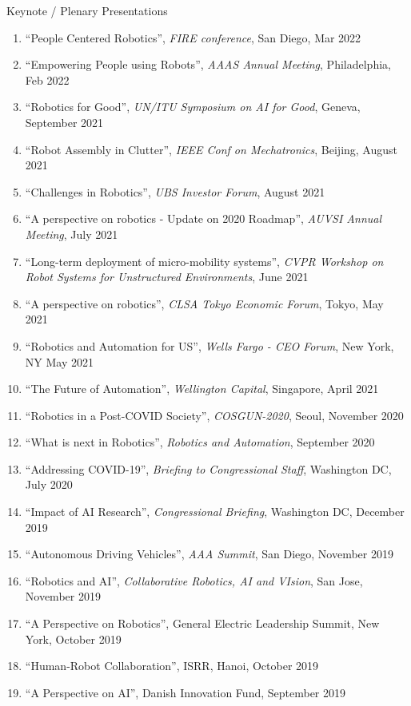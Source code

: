 \documentclass{article}
\begin{document}
\begin{cv}
\begin{cvlist}{Keynote / Plenary Presentations}
\item
  \begin{enumerate}
  \item ``People Centered Robotics'', {\em FIRE conference}, San Diego, Mar 2022
  \item ``Empowering People using Robots'', {\em AAAS Annual Meeting}, Philadelphia, Feb 2022
  \item ``Robotics for Good'', {\em UN/ITU Symposium on AI for Good}, Geneva, September 2021
  \item ``Robot Assembly in Clutter'', {\em IEEE Conf on Mechatronics}, Beijing, August 2021
  \item ``Challenges in Robotics'', {\em UBS Investor Forum}, August 2021
  \item ``A perspective on robotics - Update on 2020 Roadmap'', {\em  AUVSI Annual Meeting}, July 2021
  \item ``Long-term deployment of micro-mobility systems'', {\em CVPR Workshop on Robot Systems for Unstructured Environments}, June
    2021
  \item ``A perspective on robotics'', {\em CLSA Tokyo Economic Forum}, Tokyo, May 2021
  \item ``Robotics and Automation for US'', {\em Wells Fargo - CEO Forum}, New York, NY May 2021
  \item ``The Future of Automation'', {\em Wellington Capital}, Singapore, April 2021
  \item ``Robotics in a Post-COVID Society'', {\em COSGUN-2020}, Seoul, November 2020
  \item ``What is next in Robotics'', {\em Robotics and Automation}, September 2020
  \item ``Addressing COVID-19'', {\em Briefing to Congressional Staff}, Washington DC, July 2020
  \item ``Impact of AI Research'', {\em Congressional Briefing}, Washington DC, December 2019
  \item ``Autonomous Driving Vehicles'', {\em AAA Summit}, San Diego, November 2019
  \item ``Robotics and AI'', {\em Collaborative Robotics, AI and VIsion}, San Jose, November 2019
  \item ``A Perspective on Robotics'', General Electric Leadership Summit, New York, October 2019
  \item ``Human-Robot Collaboration'', ISRR, Hanoi, October 2019
  \item ``A Perspective on AI'', Danish Innovation Fund, September 2019

\end{enumerate}
\end{cvlist}
\end{cv}
\end{document}
